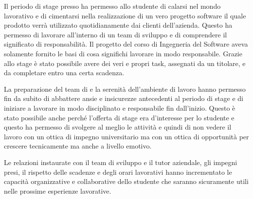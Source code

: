 Il periodo di stage presso \visione{} ha permesso allo studente di calarsi nel mondo lavorativo e di cimentarsi nella realizzazione di un vero progetto software il quale prodotto verrà utilizzato quotidianamente dai clienti dell'azienda. Questo ha permesso di lavorare all'interno di un team di sviluppo e di comprendere il significato di responsabilità. Il progetto del corso di Ingegneria del Software aveva solamente fornito le basi di cosa significhi lavorare in modo responsabile. Grazie allo stage è stato possibile avere dei veri e propri task, assegnati da un titolare, e da completare entro una certa scadenza.

La preparazione del team di \visione{} e la serenità dell'ambiente di lavoro hanno permesso fin da subito di abbattere ansie e insicurezze antecedenti al periodo di stage e di iniziare a lavorare in modo disciplinato e responsabile fin dall'inizio. Questo è stato possibile anche perché l'offerta di stage era d'interesse per lo studente e questo ha permesso di svolgere al meglio le attività e quindi di non vedere il lavoro con un ottica di impegno universitario ma con un ottica di opportunità per crescere tecnicamente ma anche a livello emotivo.

Le relazioni instaurate con il team di sviluppo e il tutor aziendale, gli impegni presi, il rispetto delle scadenze e degli orari lavorativi hanno incrementato le capacità organizzative e collaborative dello studente che saranno sicuramente utili nelle prossime esperienze lavorative.